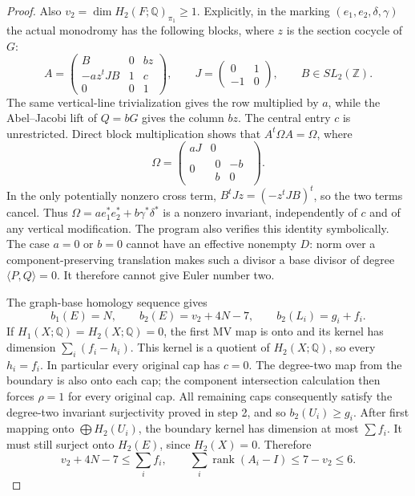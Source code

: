 \begin{proof}
Also $v_2=\dim H_2(F;\mathbb Q)_{\pi_1}\ge1$. Explicitly,
in the marking $(e_1,e_2,\delta,\gamma)$ the actual monodromy
has the following blocks, where $z$ is the section cocycle of $G$:
\[
 A=\begin{pmatrix}
 B&0&bz\\ -az^tJB&1&c\\0&0&1
 \end{pmatrix},\qquad
 J=\begin{pmatrix}0&1\\-1&0\end{pmatrix},\qquad B\in SL_2(\mathbb Z).
\]
The same vertical-line trivialization gives the row multiplied by
$a$, while the Abel--Jacobi lift of $Q=bG$ gives the column $bz$.
The central entry $c$ is unrestricted. Direct block multiplication
shows that $A^t\Omega A=\Omega$, where
\[
 \Omega=\begin{pmatrix}aJ&0\\
 0&\begin{matrix}0&-b\\ b&0\end{matrix}\end{pmatrix}.
\]
In the only potentially nonzero cross term,
$B^tJz=(-z^tJB)^t$, so the two terms cancel. Thus
$\Omega=a e_1^*e_2^*+b\gamma^*\delta^*$ is a nonzero invariant,
independently of $c$ and of any vertical modification. The program
also verifies this identity symbolically. The case $a=0$ or $b=0$ cannot have an effective
nonempty $D$: norm over a component-preserving translation makes
such a divisor a base divisor of degree $\langle P,Q\rangle=0$.
It therefore cannot give Euler number two.

The graph-base homology sequence gives
\[
 b_1(E)=N,\qquad b_2(E)=v_2+4N-7,\qquad b_2(L_i)=g_i+f_i.
\]
If $H_1(X;\mathbb Q)=H_2(X;\mathbb Q)=0$, the first MV map is
onto and its kernel has dimension $\sum_i(f_i-h_i)$. This kernel
is a quotient of $H_2(X;\mathbb Q)$, so every $h_i=f_i$.
In particular every original cap has $c=0$. The degree-two map
from the boundary is also onto each cap; the component intersection
calculation then forces $\rho=1$ for every original cap.
All remaining caps consequently satisfy the degree-two invariant
surjectivity proved in step 2, and so $b_2(U_i)\ge g_i$.
After first mapping onto $\bigoplus H_2(U_i)$, the boundary kernel
has dimension at most $\sum f_i$. It must still surject onto
$H_2(E)$, since $H_2(X)=0$. Therefore
\[
 v_2+4N-7\le\sum_i f_i,
 \qquad\sum_i\operatorname{rank}(A_i-I)\le7-v_2\le6.          \tag{D.FI4}
\]


\end{proof}
